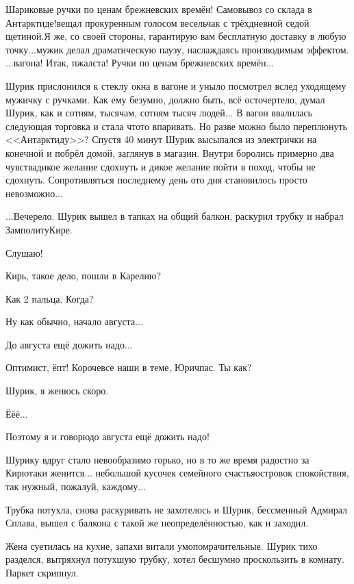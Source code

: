 {\diagdash Шариковые ручки по ценам брежневских времён! Самовывоз со склада в Антарктиде!\mdash вещал прокуренным голосом весельчак с трёхдневной седой щетиной.\mdash Я же, со своей стороны, гарантирую вам бесплатную доставку в любую точку$\ldots$\mdash мужик делал драматическую паузу, наслаждаясь производимым эффектом.\mdash $\ldots$вагона! Итак, пжалста! Ручки по ценам брежневских времён$\ldots$

Шурик прислонился к стеклу окна в вагоне и уныло посмотрел вслед уходящему мужичку с ручками. Как ему безумно, должно быть, всё осточертело, думал Шурик, как и сотням, тысячам, сотням тысяч людей$\ldots$ В вагон ввалилась следующая торговка и стала что\sdash то впаривать. Но разве можно было переплюнуть <<Антарктиду>>? Спустя 40 минут Шурик высыпался из электрички на конечной и побрёл домой, заглянув в магазин. Внутри боролись примерно два чувства\mdash дикое желание сдохнуть и дикое желание пойти в поход, чтобы не сдохнуть. Сопротивляться последнему день ото дня становилось просто невозможно$\ldots$

$\ldots$Вечерело. Шурик вышел в тапках на общий балкон, раскурил трубку и набрал Замполиту\mdash Кире.

\diagdash Слушаю!

\diagdash Кирь, такое дело, пошли в Карелию?

\diagdash Как 2 пальца. Когда?

\diagdash Ну как обычно, начало августа$\ldots$

\diagdash До августа ещё дожить надо$\ldots$

\diagdash Оптимист, ёпт! Короче\mdash все наши в теме, Юрич\mdash пас. Ты как?

\diagdash Шурик, я женюсь скоро.

\diagdash Ё\sdash ё\sdash ё$\ldots$

\diagdash Поэтому я и говорю\mdash до августа ещё дожить надо!

Шурику вдруг стало невообразимо горько, но в то же время радостно за Кирю\mdash таки женится$\ldots$ небольшой кусочек семейного счастья\mdash островок спокойствия, так нужный, пожалуй, каждому$\ldots$ 

Трубка потухла, снова раскуривать не захотелось и Шурик, бессменный Адмирал Сплава, вышел с балкона с такой же неопределённостью, как и заходил.

Жена суетилась на кухне, запахи витали умопомрачительные. Шурик тихо разделся, вытряхнул потухшую трубку, хотел бесшумно проскользить в комнату. Паркет скрипнул. 

}

